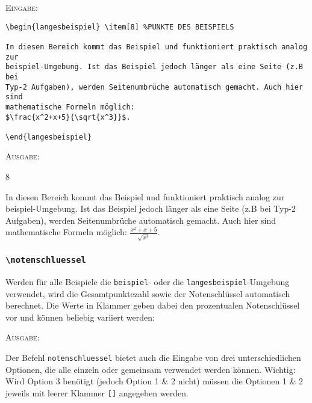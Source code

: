 \documentclass[a4paper,12pt]{article}
\begin{document}
\textsc{Eingabe:}
\begin{verbatim}
\begin{langesbeispiel} \item[8] %PUNKTE DES BEISPIELS

In diesen Bereich kommt das Beispiel und funktioniert praktisch analog zur
beispiel-Umgebung. Ist das Beispiel jedoch länger als eine Seite (z.B bei 
Typ-2 Aufgaben), werden Seitenumbrüche automatisch gemacht. Auch hier sind
mathematische Formeln möglich:
$\frac{x^2+x+5}{\sqrt{x^3}}$.		

\end{langesbeispiel}

\end{verbatim}


\textsc{Ausgabe:}

\begin{langesbeispiel} \item[8] %

In diesen Bereich kommt das Beispiel und funktioniert praktisch analog zur beispiel-Umgebung. Ist das Beispiel jedoch länger als eine Seite (z.B bei Typ-2 Aufgaben), werden Seitenumbrüche automatisch gemacht. Auch hier sind mathematische Formeln möglich:
$\frac{x^2+x+5}{\sqrt{x^3}}$.		

\end{langesbeispiel}



\subsubsection{\texttt{\textbackslash notenschluessel}}

Werden für alle Beispiele die \texttt{beispiel}- oder die \texttt{langesbeispiel}-Umgebung verwendet, wird die Gesamtpunktezahl sowie der Notenschlüssel automatisch berechnet. Die Werte in Klammer geben dabei den prozentualen Notenschlüssel vor und können beliebig variiert werden:

\vspace{0.4cm}
\setcounter{punkte}{48}
 

\vspace{0.3cm}

\textsc{Ausgabe:}
\vfill
 
Der Befehl \texttt{notenschluessel} bietet auch die Eingabe von drei unterschiedlichen Optionen, die alle einzeln oder gemeinsam verwendet werden können. Wichtig: Wird Option 3 benötigt (jedoch Option 1 \& 2 nicht) müssen die Optionen 1 \& 2 jeweils mit leerer Klammer \texttt{[]} angegeben werden.  
\end{document}

